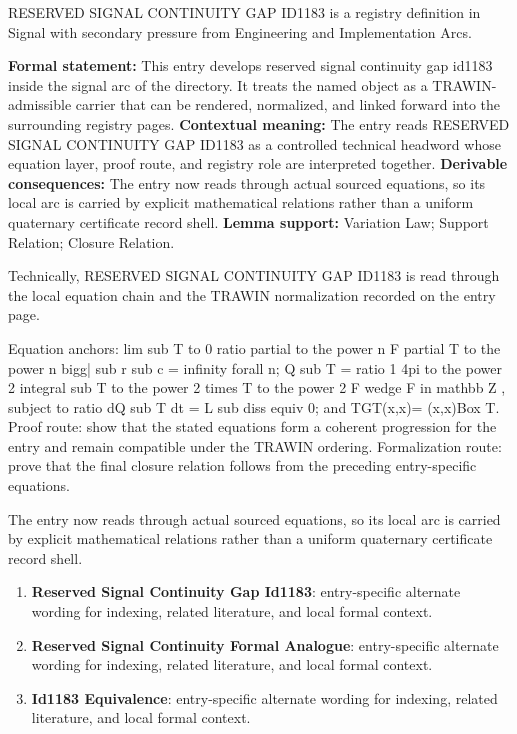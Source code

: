 
\begingroup\small
{}
RESERVED SIGNAL CONTINUITY GAP ID1183 is a registry definition in Signal with secondary pressure from Engineering and Implementation Arcs.

\begingroup\footnotesize\setlength{\emergencystretch}{3em}\sloppy
\textbf{Formal statement:} This entry develops reserved signal continuity gap id1183 inside the signal arc of the directory. It treats the named object as a TRAWIN-admissible carrier that can be rendered, normalized, and linked forward into the surrounding registry pages. \textbf{Contextual meaning:} The entry reads RESERVED SIGNAL CONTINUITY GAP ID1183 as a controlled technical headword whose equation layer, proof route, and registry role are interpreted together. \textbf{Derivable consequences:} The entry now reads through actual sourced equations, so its local arc is carried by explicit mathematical relations rather than a uniform quaternary certificate record shell. \textbf{Lemma support:} Variation Law; Support Relation; Closure Relation.\par
\endgroup

Technically, RESERVED SIGNAL CONTINUITY GAP ID1183 is read through the local equation chain and the TRAWIN normalization recorded on the entry page.

Equation anchors: lim sub T to 0 ratio partial to the power n F partial T to the power n bigg| sub r sub c = infinity forall n; Q sub T = ratio 1 4pi to the power 2 integral sub T to the power 2 times T to the power 2 F wedge F in mathbb Z , subject to ratio dQ sub T dt = L sub diss equiv 0; and TGT(x,x)= (x,x)Box  T. Proof route: show that the stated equations form a coherent progression for the entry and remain compatible under the TRAWIN ordering. Formalization route: prove that the final closure relation follows from the preceding entry-specific equations.

The entry now reads through actual sourced equations, so its local arc is carried by explicit mathematical relations rather than a uniform quaternary certificate record shell.
\endgroup

\begin{enumerate}[leftmargin=1.6em,itemsep=6pt,topsep=4pt]
\item \textbf{Reserved Signal Continuity Gap Id1183}: entry-specific alternate wording for indexing, related literature, and local formal context.
\item \textbf{Reserved Signal Continuity Formal Analogue}: entry-specific alternate wording for indexing, related literature, and local formal context.
\item \textbf{Id1183 Equivalence}: entry-specific alternate wording for indexing, related literature, and local formal context.
\end{enumerate}

